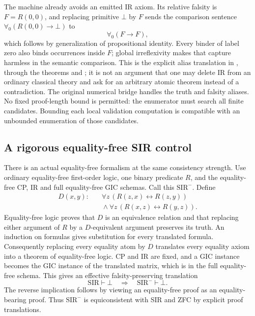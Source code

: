 The machine already avoids an emitted IR axiom.  Its relative falsity
is $F=R(0,0)$, and replacing primitive $\bot$ by $F$ sends
the comparison sentence $\forall_0(R(0,0)\to\bot)$ to
\[
 \forall_0(F\to F),
\]
which follows by generalization of propositional identity.
Every binder of label zero also binds occurrences inside $F$;
global irreflexivity makes that capture harmless in the semantic
comparison.  This is the explicit alias translation in
, through the theorems
 and ;
it is not an argument
that one may delete IR from an ordinary classical theory and ask
for an arbitrary atomic theorem instead of a contradiction.
The original numerical bridge handles the truth and falsity aliases.
No fixed proof-length bound is permitted: the enumerator must search
all finite candidates.  Bounding each local validation computation
is compatible with an unbounded enumeration of those candidates.

\subsection{A rigorous equality-free SIR control}

There is an actual equality-free formalism at the same consistency
strength.  Use ordinary equality-free first-order logic, one binary
predicate $R$, and the equality-free CP, IR and full equality-free
GIC schemas.  Call this $\mathrm{SIR}^{-}$.  Define
\[
\begin{split}
D(x,y):\quad&\forall z\,(R(z,x)\leftrightarrow R(z,y))\\
 &{}\land\forall z\,(R(x,z)\leftrightarrow R(y,z)).
\end{split}
\]
Equality-free logic proves that $D$ is an equivalence relation and
that replacing either argument of $R$ by a $D$-equivalent argument
preserves its truth.  An induction on formulas gives substitution
for every translated formula.  Consequently replacing every
equality atom by $D$ translates every equality axiom into a theorem
of equality-free logic.  CP and IR are fixed, and a GIC instance
becomes the GIC instance of the translated matrix, which is in
the full equality-free schema.  This gives an effective
falsity-preserving translation
\[
  \mathrm{SIR}\vdash\bot
       \quad\Longrightarrow\quad\mathrm{SIR}^{-}\vdash\bot.
\]
The reverse implication follows by viewing an equality-free proof
as an equality-bearing proof.  Thus $\mathrm{SIR}^{-}$ is
equiconsistent with SIR and ZFC by explicit proof translations.

